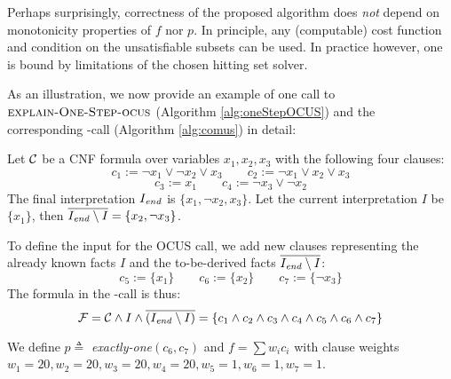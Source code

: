 Perhaps surprisingly, correctness of the proposed algorithm does \emph{not} depend on monotonicity properties of $f$ nor $p$. In principle, any (computable) cost function and condition on the unsatisfiable subsets can be used. In practice however, one is bound by limitations of the chosen hitting set solver.

As an illustration, we now provide an example of one call to $\textsc{explain-One-Step-ocus}$ (Algorithm 
\ref{alg:oneStepOCUS}) and the corresponding \comus-call (Algorithm \ref{alg:comus}) in detail: 
\begin{example}
	Let $\mathcal{C} $ be a CNF formula over variables $x_1, x_2, x_3$ with the following four clauses:
		\[ c_1 := \lnot x_1 \vee \lnot x_2 \vee x_3 \qquad  c_2 := \lnot x_1 \vee  x_2 \vee x_3\] \[  c_3 := x_1 \qquad c_4 := \lnot x_3 \vee \lnot x_2 \]
	 The final interpretation $I_\mathit{end} $ is $\{x_1, \lnot x_2,  x_3\}$. Let the current interpretation $I$ be $\{ x_1\}$, then $\overline{I_\mathit{end} \setminus I} =  \{x_2, \lnot x_3\}$.
	 
	 To define the input for the OCUS call, we add new clauses representing the already known facts $I$ and the to-be-derived facts $\overline{I_\mathit{end} \setminus I}$: 
	 \[ c_5 := \{x_1\}\qquad  c_6:=\{x_2\} \qquad  c_7 := \{\lnot x_3\}\]
	 The formula \formula in the \comus-call is thus: 
	 \[\mathcal{F} = \mathcal{C} \land I \land \overline{(I_\mathit{end} \setminus I)} = \{ c_1 \wedge c_2 \wedge c_3\wedge c_4\wedge c_5\wedge c_6\wedge c_7\}\]	
	 	 
	 We define $p\triangleq$ \textit{exactly-one$(c_6, c_7)$} and $f = \sum w_ic_i$ with clause weights $w_1 = 20, w_2=20, w_3=20, w_4=20, w_5=1, w_6=1, w_7=1$.
	 

\end{example}
